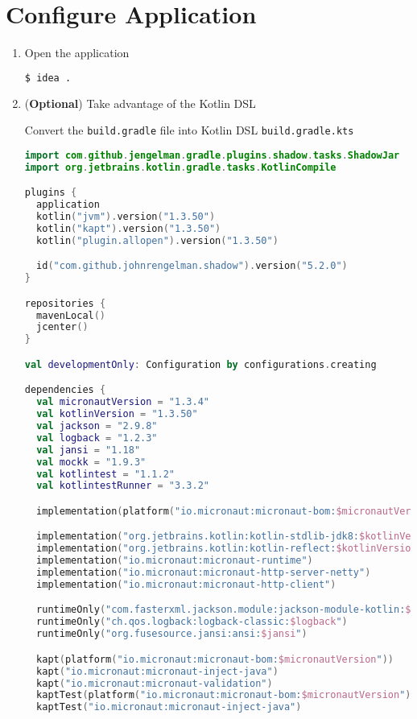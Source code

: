 \section{Configure Application}\label{sec:configuration}

\begin{enumerate}

	\item Open the application
	      \begin{lstlisting}[language=bash]
$ idea .
	      \end{lstlisting}

	\item (\textbf{Optional}) Take advantage of the Kotlin DSL

	      Convert the \texttt{build.gradle} file into Kotlin DSL \texttt{build.gradle.kts}
	      \begin{lstlisting}[language=Kotlin]
import com.github.jengelman.gradle.plugins.shadow.tasks.ShadowJar
import org.jetbrains.kotlin.gradle.tasks.KotlinCompile

plugins {
  application
  kotlin("jvm").version("1.3.50")
  kotlin("kapt").version("1.3.50")
  kotlin("plugin.allopen").version("1.3.50")

  id("com.github.johnrengelman.shadow").version("5.2.0")
}

repositories {
  mavenLocal()
  jcenter()
}

val developmentOnly: Configuration by configurations.creating

dependencies {
  val micronautVersion = "1.3.4"
  val kotlinVersion = "1.3.50"
  val jackson = "2.9.8"
  val logback = "1.2.3"
  val jansi = "1.18"
  val mockk = "1.9.3"
  val kotlintest = "1.1.2"
  val kotlintestRunner = "3.3.2"

  implementation(platform("io.micronaut:micronaut-bom:$micronautVersion"))

  implementation("org.jetbrains.kotlin:kotlin-stdlib-jdk8:$kotlinVersion")
  implementation("org.jetbrains.kotlin:kotlin-reflect:$kotlinVersion")
  implementation("io.micronaut:micronaut-runtime")
  implementation("io.micronaut:micronaut-http-server-netty")
  implementation("io.micronaut:micronaut-http-client")

  runtimeOnly("com.fasterxml.jackson.module:jackson-module-kotlin:$jackson")
  runtimeOnly("ch.qos.logback:logback-classic:$logback")
  runtimeOnly("org.fusesource.jansi:ansi:$jansi")

  kapt(platform("io.micronaut:micronaut-bom:$micronautVersion"))
  kapt("io.micronaut:micronaut-inject-java")
  kapt("io.micronaut:micronaut-validation")
  kaptTest(platform("io.micronaut:micronaut-bom:$micronautVersion"))
  kaptTest("io.micronaut:micronaut-inject-java")


\end{lstlisting}
\end{enumerate}
